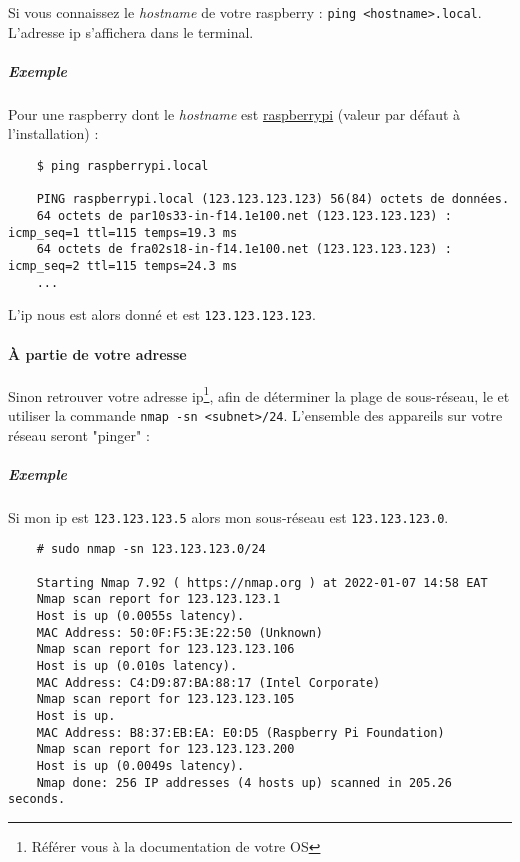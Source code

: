 Si vous connaissez le \textit{hostname} de votre \gls{raspberry} : \texttt{ping <hostname>.local}.\\
L'adresse \gls{ip} s'affichera dans le terminal.

\subparagraph{Exemple}

Pour une \gls{raspberry} dont le \textit{hostname} est \underline{raspberrypi} (valeur par défaut à
l'installation) :

\begin{verbatim}
    $ ping raspberrypi.local

    PING raspberrypi.local (123.123.123.123) 56(84) octets de données.
    64 octets de par10s33-in-f14.1e100.net (123.123.123.123) : icmp_seq=1 ttl=115 temps=19.3 ms
    64 octets de fra02s18-in-f14.1e100.net (123.123.123.123) : icmp_seq=2 ttl=115 temps=24.3 ms
    ...
\end{verbatim}

L'\gls{ip} nous est alors donné et est \texttt{123.123.123.123}.

\paragraph{À partie de votre adresse }

Sinon retrouver votre adresse \gls{ip}\footnote{Référer vous à la documentation de votre OS}, afin de déterminer
la plage de sous-réseau, le et utiliser la commande \texttt{nmap -sn <subnet>/24}.
L'ensemble des appareils sur votre réseau seront "pinger" :

\subparagraph{Exemple}

Si mon \gls{ip} est \texttt{123.123.123.5} alors mon sous-réseau est \texttt{123.123.123.0}.

\begin{verbatim}
    # sudo nmap -sn 123.123.123.0/24

    Starting Nmap 7.92 ( https://nmap.org ) at 2022-01-07 14:58 EAT
    Nmap scan report for 123.123.123.1
    Host is up (0.0055s latency).
    MAC Address: 50:0F:F5:3E:22:50 (Unknown)
    Nmap scan report for 123.123.123.106
    Host is up (0.010s latency).
    MAC Address: C4:D9:87:BA:88:17 (Intel Corporate)
    Nmap scan report for 123.123.123.105
    Host is up.
    MAC Address: B8:37:EB:EA: E0:D5 (Raspberry Pi Foundation)
    Nmap scan report for 123.123.123.200
    Host is up (0.0049s latency).
    Nmap done: 256 IP addresses (4 hosts up) scanned in 205.26 seconds.
\end{verbatim}


